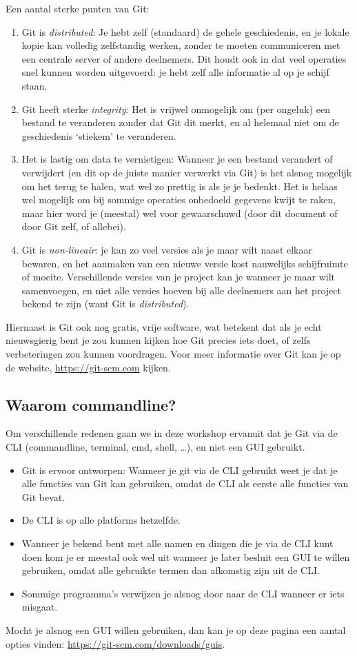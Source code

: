 Een aantal sterke punten van Git:
\begin{enumerate}
	\item Git is \emph{distributed}: Je hebt zelf (standaard) de gehele geschiedenis, en je lokale kopie kan volledig zelfstandig werken, zonder te moeten communiceren met een centrale server of andere deelnemers. Dit houdt ook in dat veel operaties snel kunnen worden uitgevoerd: je hebt zelf alle informatie al op je schijf staan.
	\item Git heeft sterke \emph{integrity}: Het is vrijwel onmogelijk om (per ongeluk) een bestand te veranderen zonder dat Git dit merkt, en al helemaal niet om de geschiedenis `stiekem' te veranderen.
	\item Het is lastig om data te vernietigen: Wanneer je een bestand verandert of verwijdert (en dit op de juiste manier verwerkt via Git) is het alsnog mogelijk om het terug te halen, wat wel zo prettig is als je je bedenkt. Het is helaas wel mogelijk om bij sommige operaties onbedoeld gegevens kwijt te raken, maar hier word je (meestal) wel voor gewaarschuwd (door dit document of door Git zelf, of allebei).
	\item Git is \emph{non-lineair}: je kan zo veel versies als je maar wilt naast elkaar bewaren, en het aanmaken van een nieuwe versie kost nauwelijks schijfruimte of moeite. Verschillende versies van je project kan je wanneer je maar wilt samenvoegen, en niet alle versies hoeven bij alle deelnemers aan het project bekend te zijn (want Git is \emph{distributed}).
\end{enumerate}
Hiernaast is Git ook nog gratis, vrije software, wat betekent dat als je echt nieuwsgierig bent je zou kunnen kijken hoe Git precies iets doet, of zelfs verbeteringen zou kunnen voordragen. Voor meer informatie over Git kan je op de website, \url{https://git-scm.com} kijken.

\subsection{Waarom commandline?}
Om verschillende redenen gaan we in deze workshop ervanuit dat je Git via de CLI (commandline, terminal, cmd, shell, \ldots), en niet een GUI gebruikt.
\begin{itemize}
	\item Git is ervoor ontworpen: Wanneer je git via de CLI gebruikt weet je dat je alle functies van Git kan gebruiken, omdat de CLI als eerste alle functies van Git bevat.
	\item De CLI is op alle platforms hetzelfde.
	\item Wanneer je bekend bent met alle namen en dingen die je via de CLI kunt doen kom je er meestal ook wel uit wanneer je later besluit een GUI te willen gebruiken, omdat alle gebruikte termen dan afkomstig zijn uit de CLI.
	\item Sommige programma's verwijzen je alsnog door naar de CLI wanneer er iets misgaat.
\end{itemize}
Mocht je alsnog een GUI willen gebruiken, dan kan je op deze pagina een aantal opties vinden: \url{https://git-scm.com/downloads/guis}.
